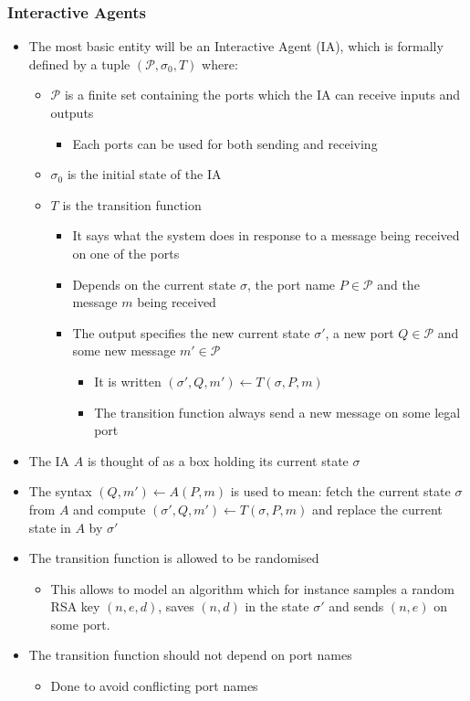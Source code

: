 \documentclass[11pt]{article}
\begin{document}
\subsubsection{Interactive Agents}
\label{sec:org140f45b}
\begin{itemize}
\item The most basic entity will be an Interactive Agent (IA), which is formally defined by a tuple \((\mathcal P, \sigma_0, T)\) where:
\begin{itemize}
\item \(\mathcal P\) is a finite set containing the ports which the IA can receive inputs and outputs
\begin{itemize}
\item Each ports can be used for both sending and receiving
\end{itemize}
\item \(\sigma_0\) is the initial state of the IA
\item \(T\) is the transition function
\begin{itemize}
\item It says what the system does in response to a message being received on one of the ports
\item Depends on the current state \(\sigma\), the port name \(P \in \mathcal P\) and the message \(m\) being received
\item The output specifies the new current state \(\sigma'\), a new port \(Q \in \mathcal P\) and some new message \(m' \in \mathcal P\)
\begin{itemize}
\item It is written \((\sigma',Q,m') \leftarrow T(\sigma, P, m)\)
\item The transition function always send a new message on some legal port
\end{itemize}
\end{itemize}
\end{itemize}

\item The IA \(A\) is thought of as a box holding its current state \(\sigma\)
\item The syntax \((Q,m') \leftarrow A(P,m)\) is used to mean: fetch the current state \(\sigma\) from \(A\) and compute \((\sigma',Q,m') \leftarrow T(\sigma,P,m)\)  and replace the current state in \(A\) by \(\sigma'\)

\item The transition function is allowed to be randomised
\begin{itemize}
\item This allows to model an algorithm which for instance samples a random RSA key \((n,e,d)\), saves \((n,d)\) in the state \(\sigma'\) and sends \((n,e)\) on some port.
\end{itemize}

\item The transition function should not depend on port names
\begin{itemize}
\item Done to avoid conflicting port names
\end{itemize}
\end{itemize}
\end{document}
